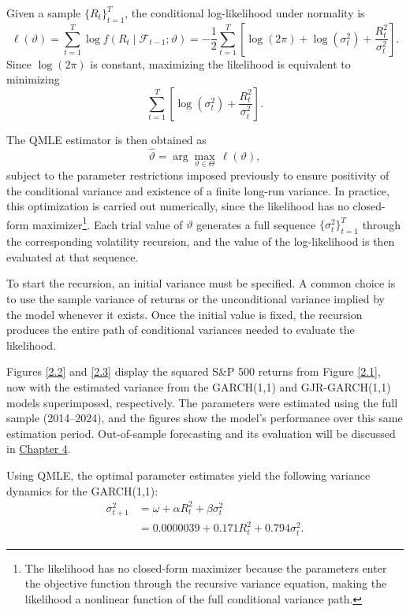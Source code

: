 Given a sample \(\{R_t\}_{t=1}^T\), the conditional log-likelihood under normality is
\[
\ell(\vartheta)
=
\sum_{t=1}^T \log f(R_t\mid \mathcal{F}_{t-1};\vartheta)
=
-\frac{1}{2}\sum_{t=1}^T
\left[
\log(2\pi)+\log(\sigma_t^2)+\frac{R_t^2}{\sigma_t^2}
\right].
\]
Since \(\log(2\pi)\) is constant, maximizing the likelihood is equivalent to minimizing
\[
\sum_{t=1}^T
\left[
\log(\sigma_t^2)+\frac{R_t^2}{\sigma_t^2}
\right].
\]

The QMLE estimator is then obtained as
\[
\hat{\vartheta}
=
\arg\max_{\vartheta\in\Theta}\,\ell(\vartheta),
\]
subject to the parameter restrictions imposed previously to ensure positivity of the conditional variance and existence of a finite long-run variance. In practice, this optimization is carried out numerically, since the likelihood has no closed-form maximizer\footnote{The likelihood has no closed-form maximizer because the parameters enter the objective function through the recursive variance equation, making the likelihood a nonlinear function of the full conditional variance path.}. Each trial value of \(\vartheta\) generates a full sequence \(\{\sigma_t^2\}_{t=1}^T\) through the corresponding volatility recursion, and the value of the log-likelihood is then evaluated at that sequence.

To start the recursion, an initial variance must be specified. A common choice is to use the sample variance of returns or the unconditional variance implied by the model whenever it exists. Once the initial value is fixed, the recursion produces the entire path of conditional variances needed to evaluate the likelihood.

Figures \ref{2.2} and \ref{2.3} display the squared S\&P 500 returns from Figure \ref{2.1}, now with the estimated variance from the GARCH(1,1) and GJR-GARCH(1,1) models superimposed, respectively. The parameters were estimated using the full sample (2014–2024), and the figures show the model’s performance over this same estimation period. Out-of-sample forecasting and its evaluation will be discussed in \hyperref[chap:4]{Chapter 4}.

Using QMLE, the optimal parameter estimates yield the following variance dynamics for the GARCH(1,1):
\begin{equation}
\begin{aligned}
    \sigma^2_{t+1} &= \omega + \alpha R^2_t + \beta \sigma^2_t \\
                   &=  0.0000039 + 0.171R^2_{t} +  0.794 \sigma^2_{t}.
\end{aligned}
\label{eq:2.3}
\end{equation}

